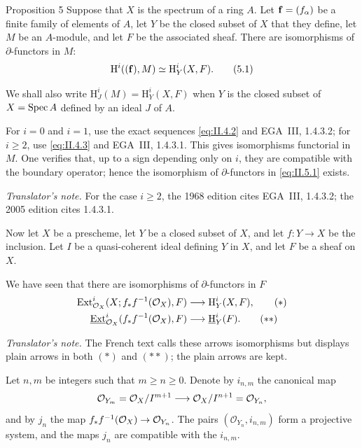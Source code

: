 \begin{sgastatement}{Proposition 5}
Suppose that $X$ is the spectrum of a ring $A$. Let
$\mathbf f=(f_\alpha)$ be a finite family of elements of $A$, let $Y$ be the
closed subset of $X$ that they define, let $M$ be an $A$-module, and let $F$
be the associated sheaf. There are isomorphisms of $\partial$-functors in
$M$:
\begin{equation}
  \mathrm H^i((\mathbf f),M)\simeq \mathrm H_Y^i(X,F).
  \tag{5.1}\label{eq:II.5.1}
\end{equation}
\end{sgastatement}

We shall also write
$\mathrm H_J^i(M)=\mathrm H_Y^i(X,F)$ when $Y$ is the closed subset of
$X=\operatorname{Spec} A$ defined by an ideal $J$ of $A$.

For $i=0$ and $i=1$, use the exact sequences
\eqref{eq:II.4.2} and EGA~III, 1.4.3.2; for $i\geq2$, use
\eqref{eq:II.4.3} and EGA~III, 1.4.3.1. This gives isomorphisms functorial in
$M$. One verifies that, up to a sign depending only on $i$, they are
compatible with the boundary operator; hence the isomorphism of
$\partial$-functors in \eqref{eq:II.5.1} exists.

\noindent\textit{Translator's note.} For the case $i\geq2$, the 1968
edition cites EGA~III, 1.4.3.2; the 2005 edition cites 1.4.3.1.

Now let $X$ be a prescheme, let $Y$ be a closed subset of $X$, and let
$f\colon Y\to X$ be the inclusion. Let $I$ be a quasi-coherent ideal defining
$Y$ in $X$, and let $F$ be a sheaf on $X$.

We have seen that there are isomorphisms of $\partial$-functors in $F$
\begin{align}
  \operatorname{Ext}_{\mathcal O_X}^i(X;f_*f^{-1}(\mathcal O_X),F)
    &\longrightarrow \mathrm H_Y^i(X,F),
    \tag{$*$}\label{eq:II.5.*}\\
  \mathop{\underline{\mathrm{Ext}}}\nolimits_{\mathcal O_X}^i(f_*f^{-1}(\mathcal O_X),F)
    &\longrightarrow \mathop{\underline{\mathrm H}}\nolimits_Y^i(F).
    \tag{$**$}\label{eq:II.5.**}
\end{align}

\noindent\textit{Translator's note.} The French text calls these
arrows isomorphisms but displays plain arrows in both $(*)$ and $(**)$;
the plain arrows are kept.

Let $n,m$ be integers such that $m\geq n\geq0$. Denote by $i_{n,m}$ the
canonical map
\[
  \mathcal O_{Y_m}=\mathcal O_X/I^{m+1}
  \longrightarrow \mathcal O_X/I^{n+1}=\mathcal O_{Y_n},
\]
and by $j_n$ the map
$f_*f^{-1}(\mathcal O_X)\to\mathcal O_{Y_n}$. The pairs
$(\mathcal O_{Y_n},i_{n,m})$ form a projective system, and the maps $j_n$ are
compatible with the $i_{n,m}$.

